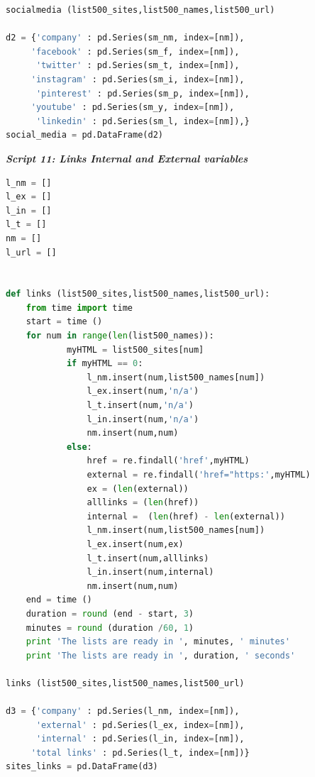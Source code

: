\documentclass{book}
\begin{document}
\begin{lstlisting}[language=Python]
socialmedia (list500_sites,list500_names,list500_url)

d2 = {'company' : pd.Series(sm_nm, index=[nm]),
     'facebook' : pd.Series(sm_f, index=[nm]),
      'twitter' : pd.Series(sm_t, index=[nm]),
     'instagram' : pd.Series(sm_i, index=[nm]),
      'pinterest' : pd.Series(sm_p, index=[nm]),
     'youtube' : pd.Series(sm_y, index=[nm]),
      'linkedin' : pd.Series(sm_l, index=[nm]),}
social_media = pd.DataFrame(d2) 
\end{lstlisting}

\begin{center}
\textit{\textbf{Script 11: Links Internal and External variables}} \label{p11}
\end{center}
\begin{lstlisting}[language=Python]
l_nm = []
l_ex = []
l_in = []
l_t = []
nm = []
l_url = []


def links (list500_sites,list500_names,list500_url):
    from time import time    
    start = time ()
    for num in range(len(list500_names)):        
            myHTML = list500_sites[num]
            if myHTML == 0:
                l_nm.insert(num,list500_names[num])            
                l_ex.insert(num,'n/a')
                l_t.insert(num,'n/a')
                l_in.insert(num,'n/a')
                nm.insert(num,num)                
            else: 
                href = re.findall('href',myHTML)
                external = re.findall('href="https:',myHTML)
                ex = (len(external))
                alllinks = (len(href))
                internal =  (len(href) - len(external))
                l_nm.insert(num,list500_names[num])            
                l_ex.insert(num,ex)
                l_t.insert(num,alllinks)
                l_in.insert(num,internal)
                nm.insert(num,num)                
    end = time ()
    duration = round (end - start, 3)
    minutes = round (duration /60, 1)
    print 'The lists are ready in ', minutes, ' minutes'
    print 'The lists are ready in ', duration, ' seconds'
 
links (list500_sites,list500_names,list500_url)

d3 = {'company' : pd.Series(l_nm, index=[nm]),
      'external' : pd.Series(l_ex, index=[nm]),
      'internal' : pd.Series(l_in, index=[nm]),
     'total links' : pd.Series(l_t, index=[nm])}
sites_links = pd.DataFrame(d3)    
\end{lstlisting}
\end{document}

